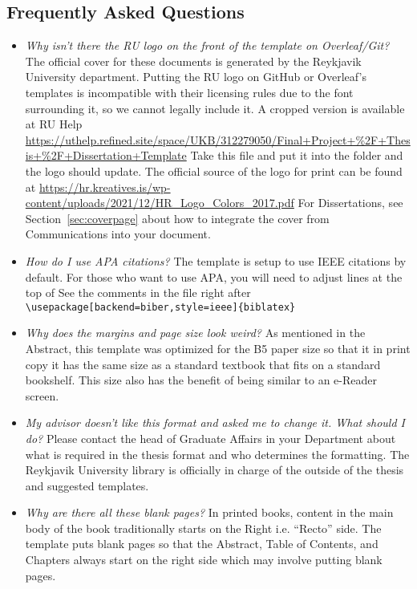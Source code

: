 \subsection{Frequently Asked Questions}
\begin{itemize}
    \item {\em Why isn't there the RU logo on the front of the template on Overleaf/Git?}
    The official cover for these documents is generated by the Reykjavik University department.
    Putting the RU logo on GitHub or Overleaf's templates is incompatible with their licensing rules due to the font surrounding it, so we cannot legally include it.
    A cropped version is available at RU Help \url{https://uthelp.refined.site/space/UKB/312279050/Final+Project+%2F+Thesis+%2F+Dissertation+Template}
    Take this file and put it into the  folder and the logo should update.
    The official source of the logo for print can be found at \url{https://hr.kreatives.is/wp-content/uploads/2021/12/HR_Logo_Colors_2017.pdf}
    For Dissertations, see Section~\ref{sec:coverpage} about how to integrate the cover from Communications into your document.    
\item {\em How do I use APA citations?}
  The template is setup to use IEEE citations by default.
  For those who want to use APA, you will need to adjust lines at the top of 
  See the comments in the file right after \verb|\usepackage[backend=biber,style=ieee]{biblatex}|

    \item {\em Why does the margins and page size look weird?}
  As mentioned in the Abstract, this template was optimized for the B5 paper size so that it in print copy it has the same size as a standard textbook that fits on a standard bookshelf.
  This size also has the benefit of being similar to an e-Reader screen.
  
  \item {\em My advisor doesn't like this format and asked me to change it.  
      What should I do?}
    Please contact the head of Graduate Affairs in your Department about what is required in the thesis format and who determines the formatting.
    The Reykjavik University library is officially in charge of the outside of the thesis and suggested templates.

  \item {\em Why are there all these blank pages?}
  In printed books, content in the main body of the book traditionally starts on the Right i.e. ``Recto'' side.
  The template puts blank pages so that the Abstract, Table of Contents, and Chapters always start on the right side which may involve putting blank pages.
  

\end{itemize}
